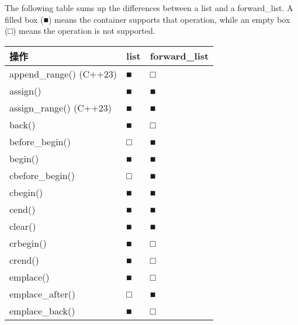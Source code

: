The following table sums up the differences between a list and a forward\_list. A filled box (■) means the container supports that operation, while an empty box (□) means the operation is not supported.

\begin{longtable}{|l|l|l|}
\hline
\textbf{操作}                           & \textbf{list} & \textbf{forward\_list} \\ \hline
\endfirsthead
%
\endhead
%
append\_range() (C++23)                      & ■             & □                      \\ \hline
assign()                                     & ■             & ■                      \\ \hline
assign\_range() (C++23)                      & ■             & ■                      \\ \hline
back()                                       & ■             & □                      \\ \hline
before\_begin()                              & □             & ■                      \\ \hline
begin()                                      & ■             & ■                      \\ \hline
cbefore\_begin()                             & □             & ■                      \\ \hline
cbegin()                                     & ■             & ■                      \\ \hline
cend()                                       & ■             & ■                      \\ \hline
clear()                                      & ■             & ■                      \\ \hline
crbegin()                                    & ■             & □                      \\ \hline
crend()                                      & ■             & □                      \\ \hline
emplace()                                    & ■             & □                      \\ \hline
emplace\_after()                             & □             & ■                      \\ \hline
emplace\_back()                              & ■             & □                      \\ \hline

\end{longtable}
